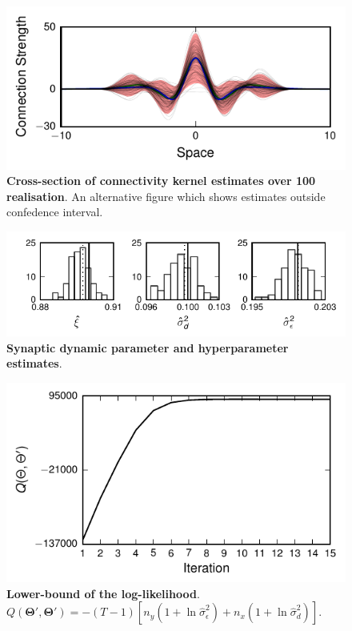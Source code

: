 \documentclass[]{article}
\begin{document}
\begin{figure}[!ht]
\begin{center}
\includegraphics{./Figures/ConfedenceIntervel.pdf}
\end{center}
\caption{{\bf Cross-section of connectivity kernel estimates over 100 realisation}. An alternative figure which shows estimates outside confedence interval.}
\label{figConfedenceIntervel}
\end{figure}

\begin{figure}[!ht]
\begin{center}
\includegraphics{./Figures/Histogram.pdf}
\end{center}
\caption{{\bf Synaptic dynamic parameter and hyperparameter estimates}.}
\label{fig:Histogram}
\end{figure}

\begin{figure}[!ht]
\begin{center}
\includegraphics{./Figures/Q.pdf}
\end{center}
\caption{{\bf Lower-bound of the log-likelihood}. $Q(\boldsymbol\Theta',\boldsymbol\Theta')=-(T-1)\left[n_y(1+\ln \hat{\sigma}^2_{\epsilon})+ n_x(1+\ln \hat{\sigma}^2_d)\right]$.}
\label{fig:FieldObserations}
\end{figure}
\end{document}
